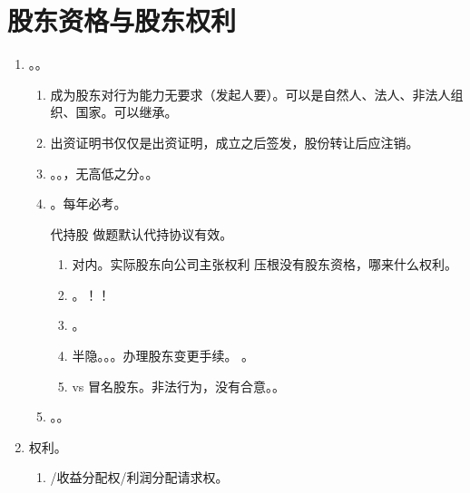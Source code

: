 \section{股东资格与股东权利}
\begin{enumerate}
  \item {}。。
        \begin{enumerate}
          \item 成为股东对行为能力无要求（发起人要）。可以是自然人、法人、非法人组织、国家。可以继承。
          \item 出资证明书仅仅是出资证明，成立之后签发，股份转让后应注销。
          \item {}。。，无高低之分。。
          \item {}。每年必考。
                \begin{kk}{代持股}
                  做题默认代持协议有效。
                  \begin{enumerate}
                    \item 对内。实际股东向公司主张权利 \yjt 压根没有股东资格，哪来什么权利。
                    \item {}。！！
                    \item {}。
                    \item 半隐。。。办理股东变更手续。
                          。
                    \item vs 冒名股东。非法行为，没有合意。。
                  \end{enumerate}
                \end{kk}
          \item {}。。
        \end{enumerate}
  \item 权利。
        \begin{enumerate}
          \item {}/收益分配权/利润分配请求权。
                \begin{enumerate}

\end{enumerate}
\end{enumerate}
\end{enumerate}
